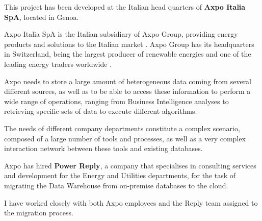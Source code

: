 This project has been developed at the Italian head quarters of \textbf{Axpo Italia SpA}, located in Genoa.

Axpo Italia SpA is the Italian subsidiary of Axpo Group, providing energy products and solutions to the Italian market \cite{bib:axpo:portrait:it}.
Axpo Group has its headquarters in Switzerland, being the largest producer of renewable energies and one of the leading energy traders worldwide \cite{bib:axpo:portrait:ch}.

Axpo needs to store a large amount of heterogeneous data coming from several different sources, as well as to be able to access these information to perform a wide range of operations, ranging from Business Intelligence analyses to retrieving specific sets of data to execute different algorithms.

The needs of different company departments constitute a complex scenario, composed of a large number of tools and processes, as well as a very complex interaction network between these tools and existing databases.

Axpo has hired \textbf{Power Reply}, a company that specialises in consulting services and development for the Energy and Utilities departments, for the task of migrating the Data Warehouse from on-premise databases to the cloud.

I have worked closely with both Axpo employees and the Reply team assigned to the migration process.
